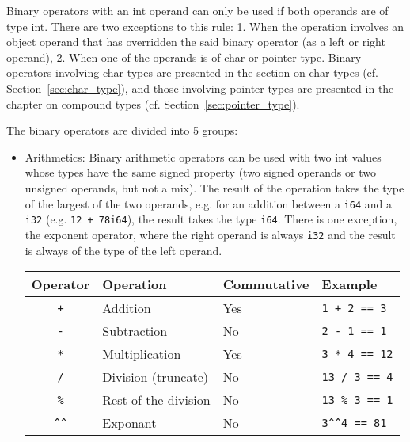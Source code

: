 Binary operators with an int operand can only be used if both operands are of
type int. There are two exceptions to this rule: 1. When the operation involves
an object operand that has overridden the said binary operator (as a left or
right operand), 2. When one of the operands is of char or pointer type. Binary
operators involving char types are presented in the section on char types
(cf. Section~\ref{sec:char_type}), and those involving pointer types are presented in
the chapter on compound types (cf. Section~\ref{sec:pointer_type}).

The binary operators are divided into 5 groups:

\begin{itemize}
\item Arithmetics: Binary arithmetic operators can be used with two int values
  whose types have the same signed property (two signed operands or two unsigned
  operands, but not a mix). The result of the operation takes the type of the
  largest of the two operands, e.g. for an addition between a \texttt{i64} and a
  \texttt{i32} (e.g. \texttt{12 + 78i64}), the result takes the type
  \texttt{i64}. There is one exception, the exponent operator, where the right
  operand is always \texttt{i32} and the result is always of the type of the
  left operand.

  \begin{center}
    \vspace{-10pt}
    \begin{adjustbox}{max width=1.0\linewidth}
      \begin{tabular}{|c|lll|}
        \hline
        Operator & Operation & Commutative & Example\\[0pt]
        \hline
        \hline
        \texttt{+} & Addition & Yes & \texttt{1 + 2 == 3}\\[0pt]
        \texttt{-} & Subtraction & No & \texttt{2 - 1 == 1}\\[0pt]
        \texttt{*} & Multiplication & Yes & \texttt{3 * 4 == 12}\\[0pt]
        \texttt{/} & Division (truncate) & No & \texttt{13 / 3 == 4}\\[0pt]
        \texttt{\%} & Rest of the division & No & \texttt{13 \% 3 == 1}\\[0pt]
        \texttt{\textasciicircum{}\textasciicircum{}} & Exponant & No & \texttt{3\textasciicircum{}\textasciicircum{}4 == 81}\\[0pt]
        \hline
      \end{tabular}
    \end{adjustbox}
  \end{center}


\end{itemize}
